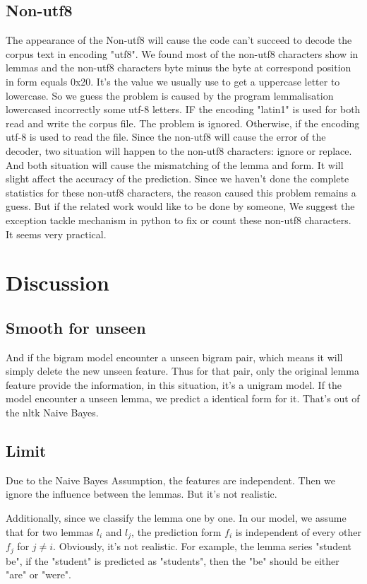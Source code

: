 \documentclass[a4paper]{article}
\begin{document}
\subsection*{Non-utf8}
The appearance  of the Non-utf8 will cause the code can't succeed to decode the corpus text in encoding "utf8". We found most of the non-utf8 characters show in lemmas and the non-utf8 characters byte minus the byte at correspond position in form equals 0x20. It's the value we usually use to get a uppercase letter to lowercase. So we guess the problem is caused by the program lemmalisation lowercased incorrectly some utf-8 letters. IF the encoding "latin1" is used for both read and write the corpus file. The problem is ignored. Otherwise, if the encoding utf-8 is used to read the file. Since the non-utf8 will cause the error of the decoder, two situation will happen to the non-utf8 characters: ignore or replace. And both situation will cause the mismatching of the lemma and form. It will slight affect the accuracy of the prediction. 
Since we haven't done the complete statistics for these non-utf8 characters, the reason caused this problem remains a guess. But if the related work would like to be done by someone, We suggest the exception tackle mechanism in python to fix or count these non-utf8 characters. It seems very practical.  

\section{Discussion}
\subsection*{Smooth for unseen}
And if the bigram model encounter a unseen bigram pair, which means it will simply delete the new unseen feature.\cite{loper_nltk.classify.naivebayes_nodate} Thus for that pair, only the original lemma feature provide the information, in this situation, it's a unigram model.
If the model encounter a unseen lemma, we predict a identical form for it. That's out of the nltk Naive Bayes. 
\subsection*{Limit}
Due to the Naive Bayes Assumption, the features are independent. Then we ignore the influence between the lemmas. But it's not realistic. 

Additionally, since we classify the lemma one by one. In our model, we assume that for two lemmas $l_i$ and $l_{j}$, the prediction form $f_{i}$ is independent of every other $f_{j}$ for $j \neq i$. Obviously, it's not realistic. For example, the lemma series "student be", if the "student" is predicted as "students", then the "be" should be either "are" or "were".
\end{document}
